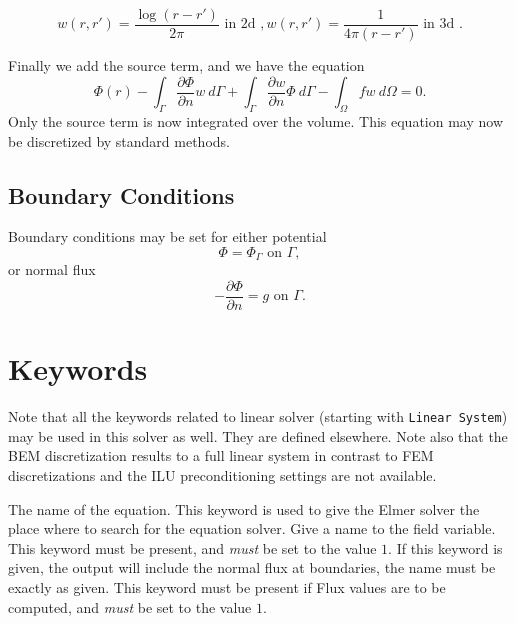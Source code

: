 \begin{versiona}
\begin{equation}
 w(r,r') = \frac{\log(r-r')}{2\pi} \mbox{ in 2d }, 
 w(r,r') = \frac{1}{4\pi(r-r')} \mbox{ in 3d }.
\end{equation}

Finally we add the source term, and we have the equation
\begin{equation}
\Phi(r) -
\int_\Gamma \frac{\partial\Phi}{\partial n} w\ d\Gamma +
\int_\Gamma \frac{\partial w}{\partial n} \Phi\ d\Gamma - \int_\Omega fw\ d\Omega = 0.
\end{equation}
Only the source term is now integrated over the volume.
This equation may now be discretized by standard methods.

\subsection{Boundary Conditions}

Boundary conditions may be set for either potential
\begin{equation}
\Phi = \Phi_\Gamma \mbox{ on } \Gamma,
\end{equation}
or normal flux
\begin{equation}
-\frac{\partial \Phi}{\partial n} = g \mbox{ on } \Gamma.
\end{equation}



\section{Keywords} 
\end{versiona}

\sifbegin

Note that all the keywords related to linear solver (starting with {\tt Linear System})
may be used in this solver as well.
They are defined elsewhere.  Note also that the BEM discretization
results to a full linear system in contrast to FEM discretizations
and the ILU preconditioning settings are not available.

\sifbegin
{} 
The name of the equation.
This keyword is used to give the Elmer solver the place where
to search for the  equation solver.
Give a name to the field variable.
This keyword must be present, and {\it must} be set to the value $1$.
If this keyword is given, the output will include the normal flux at
boundaries, the name must be exactly as given.
This keyword must be present if Flux values are to be computed,
and {\it must} be set to the value $1$.
\sifend

